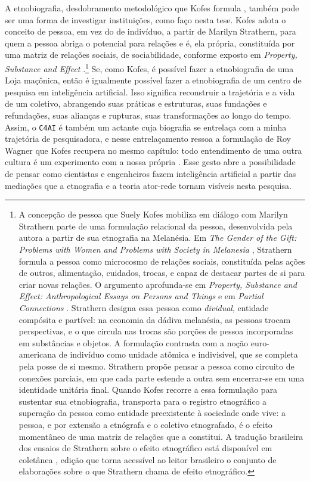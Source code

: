 A etnobiografia, desdobramento metodológico que Kofes formula \parencite{kofes2001trajetoria}, também pode ser uma forma de investigar instituições, como faço nesta tese. Kofes adota o conceito de pessoa, em vez do de indivíduo, a partir de Marilyn Strathern, para quem a pessoa abriga o potencial para relações e é, ela própria, constituída por uma matriz de relações sociais, de sociabilidade, conforme exposto em \textit{Property, Substance and Effect} \parencite{strathern2000pse}.\footnote{A concepção de pessoa que Suely Kofes mobiliza em diálogo com Marilyn Strathern parte de uma formulação relacional da pessoa, desenvolvida pela autora a partir de sua etnografia na Melanésia. Em \textit{The Gender of the Gift: Problems with Women and Problems with Society in Melanesia} \parencite{strathern1988gender}, Strathern formula a pessoa como microcosmo de relações sociais, constituída pelas ações de outros, alimentação, cuidados, trocas, e capaz de destacar partes de si para criar novas relações. O argumento aprofunda-se em \textit{Property, Substance and Effect: Anthropological Essays on Persons and Things} \parencite{strathern2000pse} e em \textit{Partial Connections} \parencite{strathern2005partial}. Strathern designa essa pessoa como \textit{dividual}, entidade compósita e partível: na economia da dádiva melanésia, as pessoas trocam perspectivas, e o que circula nas trocas são porções de pessoa incorporadas em substâncias e objetos. A formulação contrasta com a noção euro-americana de indivíduo como unidade atômica e indivisível, que se completa pela posse de si mesmo. Strathern propõe pensar a pessoa como circuito de conexões parciais, em que cada parte estende a outra sem encerrar-se em uma identidade unitária final. Quando Kofes recorre a essa formulação para sustentar sua etnobiografia, transporta para o registro etnográfico a superação da pessoa como entidade preexistente à sociedade onde vive: a pessoa, e por extensão a etnógrafa e o coletivo etnografado, é o efeito momentâneo de uma matriz de relações que a constitui. A tradução brasileira dos ensaios de Strathern sobre o efeito etnográfico está disponível em coletânea \parencite{strathern2014efeito}, edição que torna acessível ao leitor brasileiro o conjunto de elaborações sobre o que Strathern chama de efeito etnográfico.} Se, como Kofes, é possível fazer a etnobiografia de uma Loja maçônica, então é igualmente possível fazer a etnobiografia de um centro de pesquisa em inteligência artificial. Isso significa reconstruir a trajetória e a vida de um coletivo, abrangendo suas práticas e estruturas, suas fundações e refundações, suas alianças e rupturas, suas transformações ao longo do tempo. Assim, o \texttt{C4AI} é também um actante cuja biografia se entrelaça com a minha trajetória de pesquisadora, e nesse entrelaçamento ressoa a formulação de Roy Wagner que Kofes recupera no mesmo capítulo: todo entendimento de uma outra cultura é um experimento com a nossa própria \parencite[p.~296]{Kofes2015Maconaria}. Esse gesto abre a possibilidade de pensar como cientistas e engenheiros fazem inteligência artificial a partir das mediações que a etnografia e a teoria ator-rede tornam visíveis nesta pesquisa.

